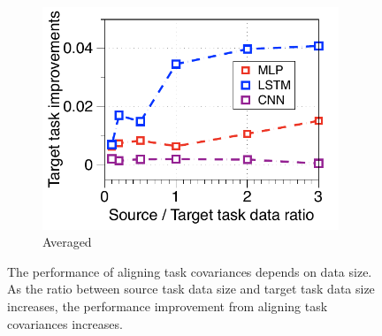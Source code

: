 \begin{figure}[!ht]
	\centering
	\begin{subfigure}[b]{0.33\textwidth}
		\centering
		\includegraphics[width=0.975\textwidth]{figures/ratio_alignment_norm_diff_all.pdf}
		\caption{Averaged}
	\end{subfigure}
	\caption{The performance of aligning task covariances depends on data size. As the ratio between source task data size and target task data size increases, the performance improvement from aligning task covariances increases.}
	\label{fig_covariate}
\end{figure}











